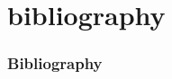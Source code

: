 \documentclass{beamer}
\begin{document}
  \section{bibliography}
    \begin{frame}[allowframebreaks]
      \frametitle{Bibliography}
      {\footnotesize{
      {\textcolor{mymidblue}{
      }}}}
  \end{frame}
  
\end{document}

